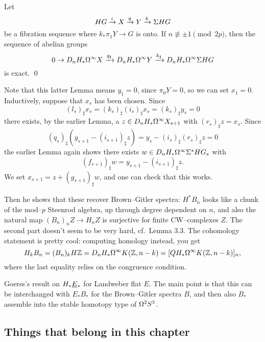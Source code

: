 \begin{lemma}
Let \[HG \xrightarrow i X \xrightarrow q Y \xrightarrow k \Sigma HG\] be a fibration sequence where $k_* \pi_1 Y \to G$ is onto.  If $n \not\equiv \pm 1 \pmod{2p}$, then the sequence of abelian groups \[0 \to D_n H_* \Omega^\infty X \xrightarrow{q_\sharp} D_n H_* \Omega^\infty Y \xrightarrow{k_\sharp} D_n H_* \Omega^\infty \Sigma HG\] is exact. \qed
\end{lemma}

Note that this latter Lemma means $y_1 = 0$, since $\pi_0 Y = 0$, so we can set $x_1 = 0$.  Inductively, suppose that $x_s$ has been chosen.  Since \[(l_s)_\sharp x_s = (k_s)_\sharp (i_s)_\sharp x_s = (k_s)_\sharp y_s = 0\] there exists, by the earlier Lemma, a $z \in D_n H_* \Omega^\infty X_{s+1}$ with $(r_s)_\sharp z = x_s$.  Since \[(q_s)_\sharp(y_{s+1} - (i_{s+1})_\sharp z) = y_s - (i_s)_\sharp (r_s)_\sharp z = 0\] the earlier Lemma again shows there exists $w \in D_n H_* \Omega^\infty \Sigma^s HG_s$ with \[(f_{s+1})_\sharp w = y_{s+1} - (i_{s+1})_\sharp z.\]  We set $x_{s+1} = z + (g_{s+1})_\sharp w$, and one can check that this works.




Then he shows that these recover Brown--Gitler spectra: $H^* B_n$ looks like a chunk of the mod--$p$ Steenrod algebra, up through degree dependent on $n$, and also the natural map $(B_n)_n Z \to H_n Z$ is surjective for finite CW--complexes $Z$.  The second part doesn't seem to be very hard, cf.\ Lemma 3.3.  The cohomology statement is pretty cool: computing homology instead, you get \[H_k B_n = (B_n)_k H\mathbb Z = D_n H_* \Omega^\infty K(\mathbb Z, n - k) = [Q H_* \Omega^\infty K(\mathbb Z, n-k)]_n,\] where the last equality relies on the congruence condition.



Goerss's result on $H_* \smash{\underline{E}}_{*}$ for Landweber flat $E$.  The main point is that this can be interchanged with $E_* B_*$ for the Brown--Gitler spectra $B$, and then also $B_*$ assemble into the stable homotopy type of $\Omega^2 S^3$.











\subsection*{Things that belong in this chapter}

